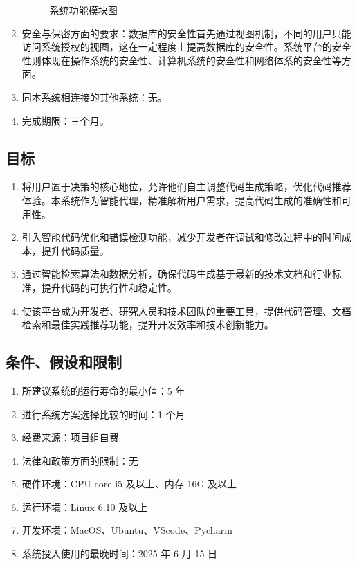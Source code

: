 \documentclass[
    report,     %
    oneside,    %
    UTF8,       %
    zihao=-4    %
]{config} %
\begin{document}
\begin{enumerate}[label=(\arabic*)]
\begin{figure}[h]
    \caption{系统功能模块图} %
    \label{fig:system-module} %
\end{figure}
    \item 安全与保密方面的要求：数据库的安全性首先通过视图机制，不同的用户只能访问系统授权的视图，这在一定程度上提高数据库的安全性。系统平台的安全性则体现在操作系统的安全性、计算机系统的安全性和网络体系的安全性等方面。
    \item 同本系统相连接的其他系统：无。
    \item 完成期限：三个月。
\end{enumerate}

\subsection{目标}
\begin{enumerate}[label=(\arabic*)]
    \item 将用户置于决策的核心地位，允许他们自主调整代码生成策略，优化代码推荐体验。本系统作为智能代理，精准解析用户需求，提高代码生成的准确性和可用性。
    \item 引入智能代码优化和错误检测功能，减少开发者在调试和修改过程中的时间成本，提升代码质量。
    \item 通过智能检索算法和数据分析，确保代码生成基于最新的技术文档和行业标准，提升代码的可执行性和稳定性。
    \item 使该平台成为开发者、研究人员和技术团队的重要工具，提供代码管理、文档检索和最佳实践推荐功能，提升开发效率和技术创新能力。
\end{enumerate}

\subsection{条件、假设和限制}
\begin{enumerate}[label=(\arabic*)]
    \item 所建议系统的运行寿命的最小值：5 年
    \item 进行系统方案选择比较的时间：1 个月
    \item 经费来源：项目组自费
    \item 法律和政策方面的限制：无
    \item 硬件环境：CPU core i5 及以上、内存 16G 及以上
    \item 运行环境：Linux 6.10 及以上
    \item 开发环境：MacOS、Ubuntu、VScode、Pycharm
    \item 系统投入使用的最晚时间：2025 年 6 月 15 日
\end{enumerate}
\end{document}
